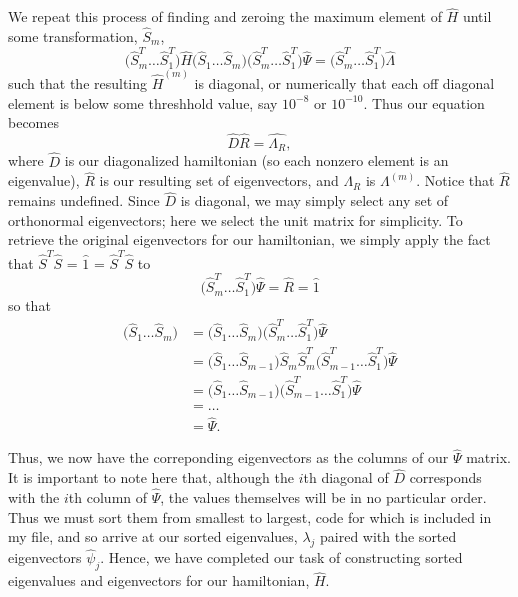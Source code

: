 \documentclass[11pt,a4paper]{article}
\begin{document}
{We repeat this process of finding and zeroing the maximum element of $\hat{H}$ until some transformation, $\hat{S}_m$, 
\begin{equation}
\big(\hat{S}_m^T\dots\hat{S}_1^T\big)\hat{H}\big(\hat{S}_1\dots\hat{S}_m\big)\big(\hat{S}_m^T\dots\hat{S}_1^T\big)\hat{\Psi} = \big(\hat{S}_m^T\dots\hat{S}_1^T\big)\hat{\Lambda}
\end{equation}
such that the resulting $\hat{H}^{(m)}$ is diagonal, or numerically that each off diagonal element is below some threshhold value, say $10^{-8}$ or $10^{-10}$. Thus our equation becomes
\begin{equation}
\hat{D}\hat{R} = \hat{\Lambda_R},
\end{equation}
where $\hat{D}$ is our diagonalized hamiltonian (so each nonzero element is an eigenvalue), $\hat{R}$ is our resulting set of eigenvectors, and $\Lambda_R$ is $\Lambda^{(m)}$. Notice that $\hat{R}$ remains undefined. Since $\hat{D}$ is diagonal, we may simply select any set of orthonormal eigenvectors; here we select the unit matrix for simplicity. To retrieve the original eigenvectors for our hamiltonian, we simply apply the fact that $\hat{S}^T\hat{S}$ = $\hat{1}$ = $\hat{S}^T\hat{S}$ to 
\begin{equation}
\big(\hat{S}_m^T\dots\hat{S}_1^T\big)\hat{\Psi} = \hat{R} = \hat{1}
\end{equation}
so that
\begin{align}
\big(\hat{S}_1\dots\hat{S}_m\big) &= \big(\hat{S}_1\dots\hat{S}_m\big)\big(\hat{S}_m^T\dots\hat{S}_1^T\big)\hat{\Psi} \\
	&= \big(\hat{S}_1\dots\hat{S}_{m-1}\big)\hat{S}_m\hat{S}_m^T\big(\hat{S}_{m-1}^T\dots\hat{S}_1^T\big)\hat{\Psi} \\
	&= \big(\hat{S}_1\dots\hat{S}_{m-1}\big)\big(\hat{S}_{m-1}^T\dots\hat{S}_1^T\big)\hat{\Psi} \\
	&= \dots \\
	&= \hat{\Psi}.
\end{align}

Thus, we now have the correponding eigenvectors as the columns of our $\hat{\Psi}$ matrix. It is important to note here that, although the $i$th diagonal of $\hat{D}$ corresponds with the $i$th column of $\hat{\Psi}$, the values themselves will be in no particular order. Thus we must sort them from smallest to largest, code for which is included in my file, and so arrive at our sorted eigenvalues, $\lambda_j$ paired with the sorted eigenvectors $\hat{\psi}_j$. Hence, we have completed our task of constructing sorted eigenvalues and eigenvectors for our hamiltonian, $\hat{H}$.

}
\end{document}
